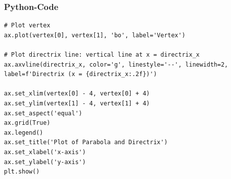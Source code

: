 \documentclass{beamer}
\begin{document}
\begin{frame}[fragile]
\frametitle{Python-Code}
\begin{lstlisting}
# Plot vertex
ax.plot(vertex[0], vertex[1], 'bo', label='Vertex')

# Plot directrix line: vertical line at x = directrix_x
ax.axvline(directrix_x, color='g', linestyle='--', linewidth=2, label=f'Directrix (x = {directrix_x:.2f})')

ax.set_xlim(vertex[0] - 4, vertex[0] + 4)
ax.set_ylim(vertex[1] - 4, vertex[1] + 4)
ax.set_aspect('equal')
ax.grid(True)
ax.legend()
ax.set_title('Plot of Parabola and Directrix')
ax.set_xlabel('x-axis')
ax.set_ylabel('y-axis')
plt.show()
\end{lstlisting}
\end{frame}
\end{document}
